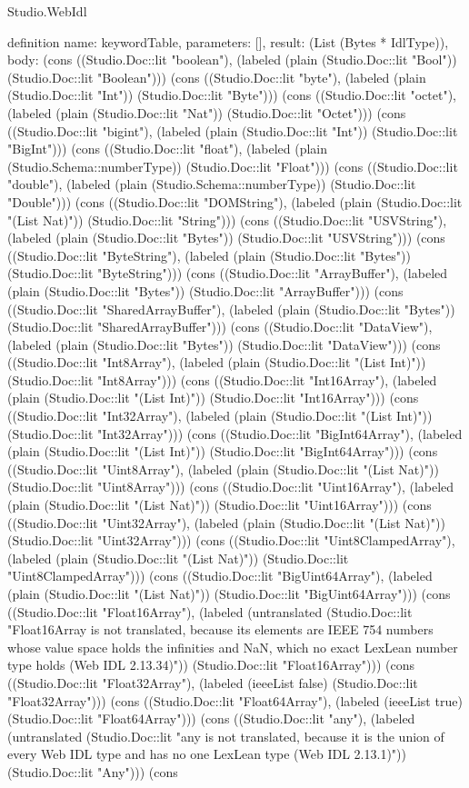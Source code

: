 \begin{lexlean}{Studio.WebIdl}
\begin{semanticmodule}
definition{
  name: keywordTable,
  parameters: [],
  result: (List (Bytes * IdlType)),
  body: (cons ((Studio.Doc::lit "boolean"), (labeled (plain (Studio.Doc::lit "Bool")) (Studio.Doc::lit "Boolean"))) (cons ((Studio.Doc::lit "byte"), (labeled (plain (Studio.Doc::lit "Int")) (Studio.Doc::lit "Byte"))) (cons ((Studio.Doc::lit "octet"), (labeled (plain (Studio.Doc::lit "Nat")) (Studio.Doc::lit "Octet"))) (cons ((Studio.Doc::lit "bigint"), (labeled (plain (Studio.Doc::lit "Int")) (Studio.Doc::lit "BigInt"))) (cons ((Studio.Doc::lit "float"), (labeled (plain (Studio.Schema::numberType)) (Studio.Doc::lit "Float"))) (cons ((Studio.Doc::lit "double"), (labeled (plain (Studio.Schema::numberType)) (Studio.Doc::lit "Double"))) (cons ((Studio.Doc::lit "DOMString"), (labeled (plain (Studio.Doc::lit "(List Nat)")) (Studio.Doc::lit "String"))) (cons ((Studio.Doc::lit "USVString"), (labeled (plain (Studio.Doc::lit "Bytes")) (Studio.Doc::lit "USVString"))) (cons ((Studio.Doc::lit "ByteString"), (labeled (plain (Studio.Doc::lit "Bytes")) (Studio.Doc::lit "ByteString"))) (cons ((Studio.Doc::lit "ArrayBuffer"), (labeled (plain (Studio.Doc::lit "Bytes")) (Studio.Doc::lit "ArrayBuffer"))) (cons ((Studio.Doc::lit "SharedArrayBuffer"), (labeled (plain (Studio.Doc::lit "Bytes")) (Studio.Doc::lit "SharedArrayBuffer"))) (cons ((Studio.Doc::lit "DataView"), (labeled (plain (Studio.Doc::lit "Bytes")) (Studio.Doc::lit "DataView"))) (cons ((Studio.Doc::lit "Int8Array"), (labeled (plain (Studio.Doc::lit "(List Int)")) (Studio.Doc::lit "Int8Array"))) (cons ((Studio.Doc::lit "Int16Array"), (labeled (plain (Studio.Doc::lit "(List Int)")) (Studio.Doc::lit "Int16Array"))) (cons ((Studio.Doc::lit "Int32Array"), (labeled (plain (Studio.Doc::lit "(List Int)")) (Studio.Doc::lit "Int32Array"))) (cons ((Studio.Doc::lit "BigInt64Array"), (labeled (plain (Studio.Doc::lit "(List Int)")) (Studio.Doc::lit "BigInt64Array"))) (cons ((Studio.Doc::lit "Uint8Array"), (labeled (plain (Studio.Doc::lit "(List Nat)")) (Studio.Doc::lit "Uint8Array"))) (cons ((Studio.Doc::lit "Uint16Array"), (labeled (plain (Studio.Doc::lit "(List Nat)")) (Studio.Doc::lit "Uint16Array"))) (cons ((Studio.Doc::lit "Uint32Array"), (labeled (plain (Studio.Doc::lit "(List Nat)")) (Studio.Doc::lit "Uint32Array"))) (cons ((Studio.Doc::lit "Uint8ClampedArray"), (labeled (plain (Studio.Doc::lit "(List Nat)")) (Studio.Doc::lit "Uint8ClampedArray"))) (cons ((Studio.Doc::lit "BigUint64Array"), (labeled (plain (Studio.Doc::lit "(List Nat)")) (Studio.Doc::lit "BigUint64Array"))) (cons ((Studio.Doc::lit "Float16Array"), (labeled (untranslated (Studio.Doc::lit "Float16Array is not translated, because its elements are IEEE 754 numbers whose value space holds the infinities and NaN, which no exact LexLean number type holds (Web IDL 2.13.34)")) (Studio.Doc::lit "Float16Array"))) (cons ((Studio.Doc::lit "Float32Array"), (labeled (ieeeList false) (Studio.Doc::lit "Float32Array"))) (cons ((Studio.Doc::lit "Float64Array"), (labeled (ieeeList true) (Studio.Doc::lit "Float64Array"))) (cons ((Studio.Doc::lit "any"), (labeled (untranslated (Studio.Doc::lit "any is not translated, because it is the union of every Web IDL type and has no one LexLean type (Web IDL 2.13.1)")) (Studio.Doc::lit "Any"))) (cons }
\end{semanticmodule}
\end{lexlean}
